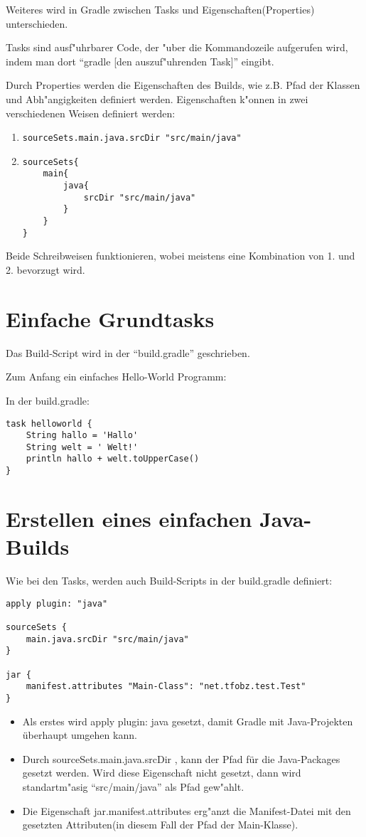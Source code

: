 Weiteres wird in Gradle zwischen Tasks und Eigenschaften(Properties) unterschieden.

Tasks sind ausf"uhrbarer Code, der "uber die Kommandozeile aufgerufen wird, indem man dort ``gradle [den auszuf"uhrenden Task]'' eingibt.

Durch Properties werden die Eigenschaften des Builds, wie z.B. Pfad der Klassen und Abh"angigkeiten definiert werden. Eigenschaften k"onnen in zwei verschiedenen Weisen definiert werden:
\begin{enumerate}
\item \begin{verbatim}
sourceSets.main.java.srcDir "src/main/java"
\end{verbatim}
\item \begin{verbatim}
sourceSets{
    main{
        java{
            srcDir "src/main/java"
        }
    }
}
\end{verbatim}
\end{enumerate}
Beide Schreibweisen funktionieren, wobei meistens eine Kombination von 1. und 2. bevorzugt wird.
\section{Einfache Grundtasks}
Das Build-Script wird in der ``build.gradle'' geschrieben.

Zum Anfang ein einfaches Hello-World Programm:

In der build.gradle:

\begin{verbatim}
task helloworld {
    String hallo = 'Hallo'
    String welt = ' Welt!'
    println hallo + welt.toUpperCase()
}
\end{verbatim}

\section{Erstellen eines einfachen Java-Builds}
Wie bei den Tasks, werden auch Build-Scripts in der build.gradle definiert:

\begin{verbatim}
apply plugin: "java"

sourceSets {
    main.java.srcDir "src/main/java"
}

jar {
    manifest.attributes "Main-Class": "net.tfobz.test.Test"
}
\end{verbatim}
\begin{itemize}
\item Als erstes wird apply plugin: java gesetzt, damit Gradle mit Java-Projekten überhaupt umgehen kann.
\item Durch sourceSets.main.java.srcDir , kann der Pfad für die Java-Packages gesetzt werden. Wird diese Eigenschaft nicht gesetzt, dann wird standartm"asig ``src/main/java'' als Pfad gew"ahlt.
\item Die Eigenschaft jar.manifest.attributes erg"anzt die Manifest-Datei mit den gesetzten Attributen(in diesem Fall der Pfad der Main-Klasse).
\end{itemize}
